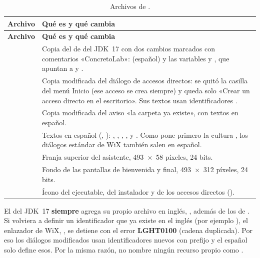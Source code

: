 \begin{longtable}{L{4.6cm}L{10.2cm}}
	\caption{Archivos de .} \label{tab:dis-recursos} \\
	\hline
	\textbf{Archivo} & \textbf{Qué es y qué cambia} \\ \hline
	\endfirsthead
	\hline
	\textbf{Archivo} & \textbf{Qué es y qué cambia} \\ \hline
	\endhead
	\hline
	\endfoot
	 & Copia del  de  del JDK~17 con dos cambios marcados con comentarios
	«ConcretoLab»:  (español) y las variables  y ,
	que apuntan a  y
	. \\
	 & Copia modificada del diálogo de accesos directos: se quitó la casilla del menú Inicio
	(ese acceso se crea siempre) y queda solo «Crear un acceso directo en el escritorio». Sus textos usan
	identificadores . \\
	 & Copia modificada del aviso «la carpeta ya existe», con textos  en
	español. \\
	 & Textos en español (, ):
	, , ,
	,  y . Como
	 pone primero la cultura , los diálogos estándar de WiX también salen en español. \\
	 & Franja superior del asistente, 493~$\times$~58 píxeles, 24 bits. \\
	 & Fondo de las pantallas de bienvenida y final, 493~$\times$~312 píxeles, 24 bits. \\
	 & Ícono del ejecutable, del instalador y de los accesos directos (). \\
\end{longtable}

\begin{importante}
El  del JDK~17 \textbf{siempre} agrega su propio archivo en inglés, ,
además de los  de . Si  volviera a definir un
identificador que ya existe en el inglés (por ejemplo ), el enlazador de WiX,
, se detiene con el error \textbf{LGHT0100} (cadena duplicada). Por eso los diálogos modificados usan
identificadores nuevos con prefijo  y el  español solo define esos. Por la misma razón, no nombre
ningún recurso propio como .
\end{importante}

